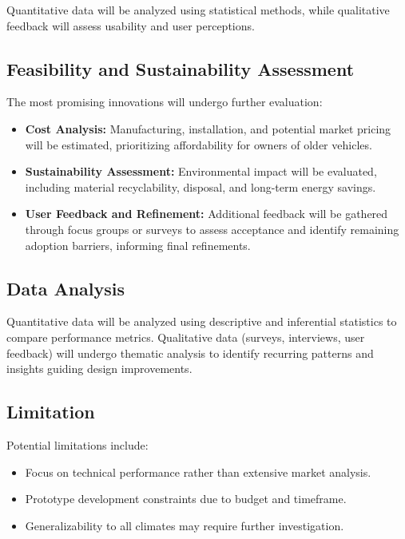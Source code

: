 \documentclass{article}
\theoremstyle{mytheoremstyle}
\theoremstyle{mytheoremstyle}
\theoremstyle{myproblemstyle}
\begin{document}
Quantitative data will be analyzed using statistical methods, while qualitative feedback will assess usability and user perceptions.
\subsection{Feasibility and Sustainability Assessment}
The most promising innovations will undergo further evaluation:
\begin{itemize}
	\item \textbf{Cost Analysis:} Manufacturing, installation, and potential market pricing will be estimated, prioritizing affordability for owners of older vehicles.
	\item \textbf{Sustainability Assessment: }Environmental impact will be evaluated, including material recyclability, disposal, and long-term energy savings.
	\item \textbf{User Feedback and Refinement:} Additional feedback will be gathered through focus groups or surveys to assess acceptance and identify remaining adoption barriers, informing final refinements.
\end{itemize}

\subsection{Data Analysis}
Quantitative data will be analyzed using descriptive and inferential statistics to compare performance metrics. Qualitative data (surveys, interviews, user feedback) will undergo thematic analysis to identify recurring patterns and insights guiding design improvements.

\subsection{Limitation}
Potential limitations include:
\begin{itemize}
\item Focus on technical performance rather than extensive market analysis.
\item Prototype development constraints due to budget and timeframe.
\item Generalizability to all climates may require further investigation.
\end{itemize}

\end{document}
